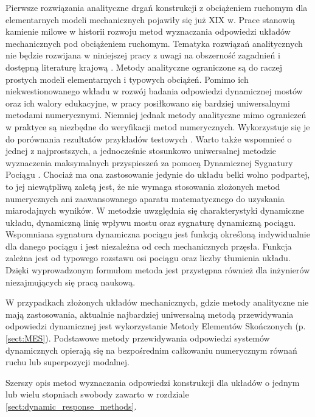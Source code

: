 Pierwsze rozwiązania analityczne drgań konstrukcji z obciążeniem ruchomym dla elementarnych modeli mechanicznych pojawiły się już XIX w. Prace \parencite{Willis1849,Stokes1849,Saller1921,Timoshenko1922,Inglis1934,Kolousek1973} stanowią kamienie milowe w historii rozwoju metod wyznaczania odpowiedzi układów mechanicznych pod obciążeniem ruchomym. Tematyka rozwiązań analitycznych nie będzie rozwijana w niniejszej pracy z uwagi na obszerność zagadnień i dostępną literaturę krajową \parencite{Szczesniak2018}. Metody analityczne ograniczone są do raczej prostych modeli elementarnych i typowych obciążeń. Pomimo ich niekwestionowanego wkładu w rozwój badania odpowiedzi dynamicznej mostów oraz ich walory edukacyjne, w pracy posiłkowano się bardziej uniwersalnymi metodami numerycznymi. Niemniej jednak metody analityczne mimo ograniczeń w praktyce są niezbędne do weryfikacji metod numerycznych. Wykorzystuje się je do porównania rezultatów przykładów testowych . Warto także wspomnieć o jednej z najprostszych, a jednocześnie stosunkowo uniwersalnej metodzie wyznaczenia maksymalnych przyspieszeń za pomocą Dynamicznej Sygnatury Pociągu  \parencite{Goicolea2008a,ERRI1998}. Chociaż ma ona zastosowanie jedynie do układu belki wolno podpartej, to jej niewątpliwą zaletą jest, że nie wymaga stosowania złożonych metod numerycznych ani zaawansowanego aparatu matematycznego do uzyskania miarodajnych wyników. W metodzie uwzględnia się charakterystyki dynamiczne układu, dynamiczną linię wpływu mostu  oraz sygnaturę dynamiczną pociągu. Wspomniana sygnatura dynamiczna pociągu jest funkcją określoną indywidualnie dla danego pociągu i jest niezależna od cech mechanicznych przęsła. Funkcja zależna jest od typowego rozstawu osi pociągu oraz liczby tłumienia układu. Dzięki wyprowadzonym formułom metoda jest przystępna również dla inżynierów niezajmujących się pracą naukową.

W przypadkach złożonych układów mechanicznych, gdzie metody analityczne nie mają zastosowania, aktualnie najbardziej uniwersalną metodą przewidywania odpowiedzi dynamicznej jest wykorzystanie Metody Elementów Skończonych (p. \ref{sect:MES}). Podstawowe metody przewidywania odpowiedzi systemów dynamicznych opierają się na bezpośrednim całkowaniu numerycznym równań ruchu lub superpozycji modalnej. 

Szerszy opis metod wyznaczania odpowiedzi konstrukcji dla układów o jednym lub wielu stopniach swobody zawarto w rozdziale \ref{sect:dynamic_response_methods}.


